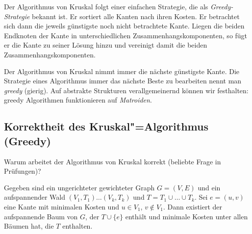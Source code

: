 Der Algorithmus von Kruskal folgt einer einfachen Strategie, die als \textit{Greedy-Strategie} bekannt ist. Er sortiert alle Kanten nach ihren Kosten. Er betrachtet sich dann die jeweils günstigste noch nicht betrachtete Kante. Liegen die beiden Endknoten der Kante in unterschiedlichen Zusammenhangskomponenten, so fügt er die Kante zu seiner Lösung hinzu und vereinigt damit die beiden Zusammenhangskomponenten.

Der Algorithmus von Kruskal nimmt immer die nächste günstigste Kante. Die Strategie eines Algorithmus immer das nächste Beste zu bearbeiten nennt man \textit{greedy} (gierig). Auf abstrakte Strukturen verallgemeinernd können wir festhalten: greedy Algorithmen funktionieren auf \textit{Matroiden}.

%



\subsection{Korrektheit des Kruskal"=Algorithmus (Greedy)}
Warum arbeitet der Algorithmus von Kruskal korrekt (beliebte Frage in Prüfungen)?

\begin{Lma}\label{kap4LmaKruskal}
\hspace{\parindent}Gegeben sind ein ungerichteter gewichteter Graph $G=(V, E)$ und ein aufspannender Wald $(V_1, T_1) \ldots (V_k, T_k)$ und $T=T_1 \cup \ldots \cup T_k$. Sei $e=(u,v)$ eine Kante mit minimalen Kosten und $u \in V_1$, $v \notin V_1$. Dann existiert der aufspannende Baum von $G$, der $T \cup \{e\}$ enthält und minimale Kosten unter allen Bäumen hat, die $T$ enthalten.
\end{Lma}

